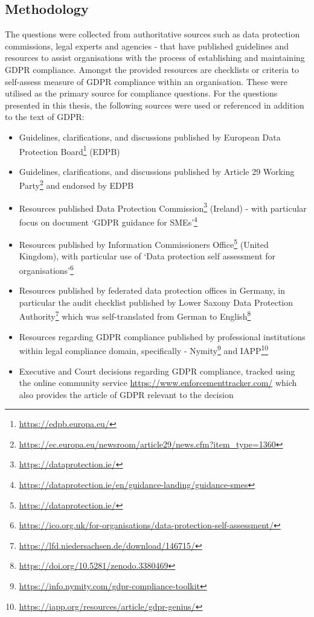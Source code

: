 \subsection{Methodology}\label{sec:info:compliance-questions-methodology}
The questions were collected from authoritative sources such as data protection commissions, legal experts and agencies - that have published guidelines and resources to assist organisations with the process of establishing and maintaining GDPR compliance.
Amongst the provided resources are checklists or criteria to self-assess measure of GDPR compliance within an organisation. These were utilised as the primary source for compliance questions.
For the questions presented in this thesis, the following sources were used or referenced in addition to the text of GDPR:
\begin{itemize}
    \item Guidelines, clarifications, and discussions published by European Data Protection Board\footnote{\url{https://edpb.europa.eu/}} (EDPB)
    \item Guidelines, clarifications, and discussions published by Article 29 Working Party\footnote{\url{https://ec.europa.eu/newsroom/article29/news.cfm?item_type=1360}} and endorsed by EDPB
    \item Resources published Data Protection Commission\footnote{\url{https://dataprotection.ie/}} (Ireland) - with particular focus on document `GDPR guidance for SMEs'\footnote{\url{https://dataprotection.ie/en/guidance-landing/guidance-smes}}
    \item Resources published by Information Commissioners Office\footnote{\url{https://dataprotection.ie/}} (United Kingdom), with particular use of `Data protection self assessment for organisations'\footnote{\url{https://ico.org.uk/for-organisations/data-protection-self-assessment/}}
    \item Resources published by federated data protection offices in Germany, in particular the audit checklist published by Lower Saxony Data Protection Authority\footnote{\url{https://lfd.niedersachsen.de/download/146715/}} which was self-translated from German to English\footnote{\url{https://doi.org/10.5281/zenodo.3380469}}
    \item Resources regarding GDPR compliance published by professional institutions within legal compliance domain, specifically - Nymity\footnote{\url{https://info.nymity.com/gdpr-compliance-toolkit}} and IAPP\footnote{\url{https://iapp.org/resources/article/gdpr-genius/}}
    \item Executive and Court decisions regarding GDPR compliance, tracked using the online community service \url{https://www.enforcementtracker.com/} which also provides the article of GDPR relevant to the decision
\end{itemize}


